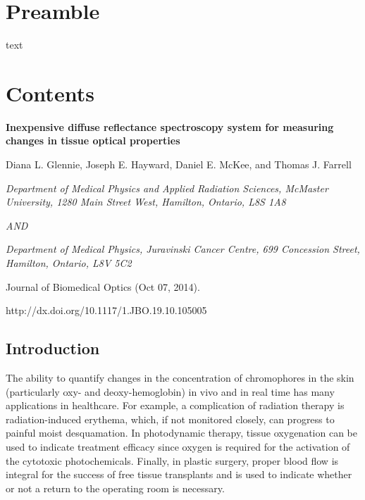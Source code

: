 \section{Preamble}
text

\section{Contents}

\begin{center}

\textbf{Inexpensive diffuse reflectance spectroscopy system for measuring changes in tissue optical properties}

\bigskip
\bigskip

Diana L. Glennie, Joseph E. Hayward, Daniel E. McKee, and Thomas J. Farrell

\bigskip
\bigskip

\textit{Department of Medical Physics and Applied Radiation Sciences, McMaster University, 1280 Main Street West, Hamilton, Ontario, L8S 1A8}

\textit{AND}

\textit{Department of Medical Physics, Juravinski Cancer Centre, 699 Concession Street, Hamilton, Ontario, L8V 5C2}

\end{center}

\bigskip
\bigskip

\noindent Journal of Biomedical Optics (Oct 07, 2014).

\noindent http://dx.doi.org/10.1117/1.JBO.19.10.105005

\subsection{Introduction}
The ability to quantify changes in the concentration of chromophores in the skin (particularly oxy- and deoxy-hemoglobin) in vivo and in real time has many applications in healthcare. For example, a complication of radiation therapy is radiation-induced erythema, which, if not monitored closely, can progress to painful moist desquamation.\cite{Hopewell1990,Russell1994,Nystrom2004,Fitzgerald2008} In photodynamic therapy, tissue oxygenation can be used to indicate treatment efficacy\cite{Woodhams2007} since oxygen is required for the activation of the cytotoxic photochemicals.\cite{Patterson1989a,Wilson2008} Finally, in plastic surgery, proper blood flow is integral for the success of free tissue transplants and is used to indicate whether or not a return to the operating room is necessary.\cite{Steele2011}

